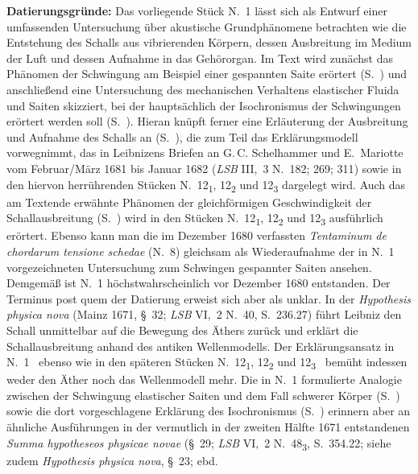 \begin{ledgroup}
\footnotesize
\pstart
\noindent%
\textbf{Datierungsgründe:}
Das vorliegende Stück N.~1 lässt sich als Entwurf einer umfassenden Unter\-su\-chung über akustische Grundphänomene betrachten wie die Entstehung des Schalls aus vibrierenden Körpern, dessen Ausbreitung im Medium der Luft und dessen Aufnahme in das Gehörorgan.
Im Text wird zunächst das Phänomen der Schwingung am Beispiel einer gespannten Saite erörtert (S.~) und anschließend eine Untersuchung des mechanischen Verhaltens elastischer Fluida und Saiten skizziert, bei der haupt\-säch\-lich der Isochronismus der Schwingungen erörtert werden soll (S.~).
Hieran knüpft ferner eine Erläuterung der Ausbreitung und Aufnahme des Schalls an (S.~),
die zum Teil das Erklärungsmodell vorwegnimmt, das in Leibnizens Briefen an G.\,C. Schelhammer und E.~Mariotte vom Februar/März 1681 bis Januar 1682 (\textit{LSB} III,~3 N.~182;\cite{01194} 269\cite{01193}; 311\cite{01195}) sowie in den hiervon herrührenden Stücken N.~12\textsubscript{1}, 12\textsubscript{2} und 12\textsubscript{3} dargelegt wird.
Auch das am Textende erwähnte Phänomen der gleich\-för\-mi\-gen Geschwindigkeit der Schallausbreitung (S.~) wird in den Stücken N.~12\textsubscript{1}, 12\textsubscript{2} und 12\textsubscript{3} ausführlich erörtert.
Ebenso kann man die im Dezember 1680 verfassten \textit{Tentaminum de chordarum tensione schedae} (N.~8) gleichsam als Wie\-der\-auf\-nahme der in N.~1 vorgezeichneten Untersuchung zum Schwingen gespannter Saiten %
ansehen.
Demgemäß ist N.~1 höchstwahrscheinlich %
vor Dezember 1680 entstanden.
\pend
\pstart
Der Terminus post quem der Datierung erweist sich aber als unklar.
In der \textit{Hypothesis physica nova} (Mainz 1671, §~32; \textit{LSB} VI,~2 N.~40, S.~236.27\cite{00256}) führt Leibniz den Schall unmittelbar auf die Bewegung des Äthers zurück und erklärt die Schallausbreitung anhand des antiken Wellenmodells.
Der Erklärungs\-ansatz in N.~1 \textendash\ ebenso wie in den späteren Stücken N.~12\textsubscript{1}, 12\textsubscript{2} und 12\textsubscript{3} \textendash\ bemüht indessen weder den Äther noch das Wellenmodell mehr.
Die in N.~1 formulierte Analogie zwischen der Schwingung elastischer Saiten und dem Fall schwerer Körper (S.~) sowie die dort vorgeschlagene Erklärung des Isochronismus (S.~) erinnern aber an ähnliche Ausführungen in der vermut\-lich in der zweiten Hälfte 1671 entstandenen \textit{Summa hypotheseos physicae novae} (§~29; \textit{LSB} VI,~2 N.~48\textsubscript{3}, S.~354.22\cite{01276}; siehe zudem \textit{Hypothesis physica nova}, §~23; ebd. %

\end{ledgroup}
